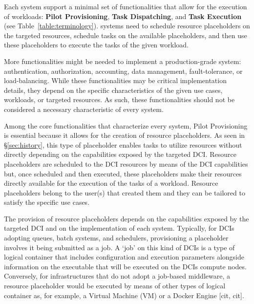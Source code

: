 \documentclass{sig-alternate}
\begin{document}
Each \pilot system support a minimal set of functionalities that allow for the
execution of workloads: \textbf{Pilot Provisioning}, \textbf{Task Dispatching},
and \textbf{Task Execution} (see Table~\ref{table:terminology}). \pilot systems
need to schedule resource placeholders on the targeted resources, schedule
tasks on the available placeholders, and then use these placeholders to execute
the tasks of the given workload.

More functionalities might be needed to implement a production-grade \pilot
system: authentication, authorization, accounting, data management,
fault-tolerance, or load-balancing. While these functionalities may be critical
implementation details, they depend on the specific characteristics of the
given use cases, workloads, or targeted resources. As such, these
functionalities should not be considered a necessary characteristic of every
\pilot system.

Among the core functionalities that characterize every \pilot system, Pilot
Provisioning is essential because it allows for the creation of resource
placeholders. As seen in \S\ref{sec:history}, this type of placeholder enables
tasks to utilize resources without directly depending on the capabilities
exposed by the targeted DCI. Resource placeholders are scheduled to the DCI
resources by means of the DCI capabilities but, once scheduled and then
executed, these placeholders make their resources directly available for the
execution of the tasks of a workload. Resource placeholders belong to the
user(s) that created them and they can be tailored to satisfy the specific use
cases. 


The provision of resource placeholders depends on the capabilities exposed by
the targeted DCI and on the implementation of each \pilot system. Typically,
for DCIs adopting queues, batch systems, and schedulers, provisioning a
placeholder involves it being submitted as a job. A `job' on this kind of DCIs
is a type of logical container that includes configuration and execution
parameters alongside information on the executable that will be executed on the
DCIs compute nodes. Conversely, for infrastructures that do not adopt a
job-based middleware, a resource placeholder would be executed by means of
other types of logical container as, for example, a Virtual Machine (VM) or a
Docker Engine [cit, cit].
\end{document}
